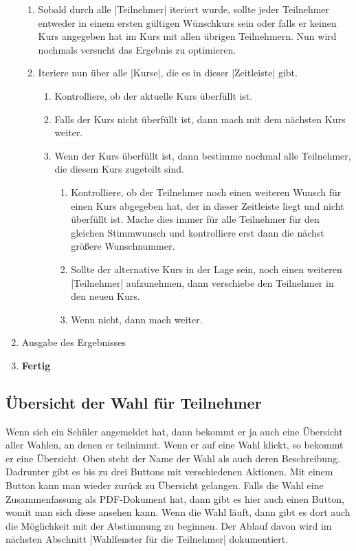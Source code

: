 \documentclass[ngerman]{ltxdoc}
\begin{document}
\begin{enumerate}
\begin{enumerate}
    \item Sobald durch alle |Teilnehmer| iteriert wurde, sollte jeder Teilnehmer
    entweder in einem ersten gültigen Wünschkurs sein oder falls er keinen Kurs
    angegeben hat im Kurs mit allen übrigen Teilnehmern. Nun wird nochmals
    versucht das Ergebnis zu optimieren.
    \item Iteriere nun über alle |Kurse|, die es in dieser |Zeitleiste| gibt.
    \begin{enumerate}
      \item Kontrolliere, ob der aktuelle Kurs überfüllt ist.
      \item Falls der Kurs nicht überfüllt ist, dann mach mit dem nächsten Kurs
      weiter.
      \item Wenn der Kurs überfüllt ist, dann bestimme nochmal alle Teilnehmer,
      die diesem Kurs zugeteilt sind.
      \begin{enumerate}
        \item Kontrolliere, ob der Teilnehmer noch einen weiteren Wunsch für einen
        Kurs abgegeben hat, der in dieser Zeitleiste liegt und nicht überfüllt ist.
        Mache dies immer für alle Teilnehmer für den gleichen Stimmwunsch und
        kontrolliere erst dann die nächst größere Wunschnummer.
        \item Sollte der alternative Kurs in der Lage sein, noch einen weiteren
        |Teilnehmer| aufzunehmen, dann verschiebe den Teilnehmer in den neuen Kurs.
        \item Wenn nicht, dann mach weiter.
      \end{enumerate}
    \end{enumerate}
  \end{enumerate}
  \item Ausgabe des Ergebnisses
  \item \textbf{Fertig}
\end{enumerate}

\subsection{Übersicht der Wahl für Teilnehmer}

Wenn sich ein Schüler angemeldet hat, dann bekommt er ja auch eine Übersicht
aller Wahlen, an denen er teilnimmt. Wenn er auf eine Wahl klickt, so bekommt
er eine Übersicht. Oben steht der Name der Wahl als auch deren Beschreibung. Dadrunter
gibt es bis zu drei Buttons mit verschiedenen Aktionen. Mit einem Button kann man
wieder zurück zu Übersicht gelangen. Falls die Wahl eine Zusammenfassung als
PDF-Dokument hat, dann gibt es hier auch einen Button, womit man sich diese ansehen kann.
Wenn die Wahl läuft, dann gibt es dort auch die Möglichkeit mit der Abstimmung
zu beginnen. Der Ablauf davon wird im nächsten Abschnitt |Wahlfenster für die Teilnehmer|
dokumentiert.
\end{document}
